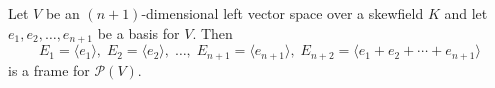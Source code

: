 Let $V$ be an $(n+1)$-dimensional left vector space over a skewfield $K$ and let $e_1, e_2, \dots, e_{n+1}$ be a basis for $V$. Then
$$
E_1 = \langle e_1 \rangle,\; E_2 = \langle e_2 \rangle,\; \dots,\; E_{n+1} = \langle e_{n+1} \rangle,\; E_{n+2} = \langle e_1 + e_2 + \cdots + e_{n+1} \rangle
$$
is a frame for $\mathcal{P}(V)$.
